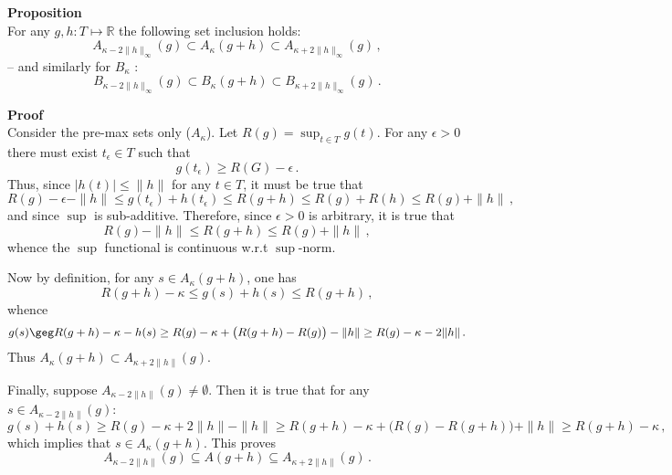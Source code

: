 \documentclass[a4paper]{article}
\newcommand{\Real}{\mathbb{R}}
\begin{document}
\noindent\textbf{Proposition}\hfill\\
For any $g, h:T\mapsto \Real$ the following set inclusion holds:
\[ A_{\kappa - 2\|h\|_\infty}(g) \subset A_\kappa(g+h)
                                 \subset A_{\kappa + 2\|h\|_\infty}(g)\,, \]
-- and similarly for $B_\kappa$ :
\[ B_{\kappa - 2\|h\|_\infty}(g) \subset B_\kappa(g+h)
                                 \subset B_{\kappa + 2\|h\|_\infty}(g)\,. \]

\noindent \textbf{Proof}\hfill\\
Consider the pre-max sets only ($A_\kappa$). Let $R(g) = \sup_{t\in T} g(t)$.
For any $\epsilon>0$ there must exist $t_\epsilon\in T$ such that
\[ g(t_\epsilon) \geq R(G) - \epsilon \,. \]
Thus, since $|h(t)| \leq \|h\|$ for any $t\in T$, it must be true that
\[ R(g) - \epsilon - \|h\| \leq g(t_\epsilon) + h(t_\epsilon)
                           \leq R(g + h)
                           \leq R(g) + R(h)
                           \leq R(g) + \|h\|\,,
\]
and since $\sup$ is sub-additive. Therefore, since $\epsilon>0$ is arbitrary,
it is true that
\[ R(g) - \|h\| \leq R(g + h) \leq R(g) + \|h\|\,, \]
whence the $\sup$ functional is continuous w.r.t $\sup$-norm.

Now by definition, for any $s\in A_\kappa(g+h)$, one has
\[ R(g+h) - \kappa \leq g(s)+h(s) \leq R(g+h)\,, \]
whence
\[ g(s) \geg R(g+h) - \kappa - h(s)
        \geq R(g) - \kappa + \bigl(R(g+h) - R(g)\bigr) - \|h\|
        \geq R(g) - \kappa - 2\|h\|\,. \]
Thus $A_\kappa(g+h) \subset A_{\kappa + 2\|h\|}(g)$.

Finally, suppose $A_{\kappa-2\|h\|}(g) \neq \emptyset$. Then it is true that
for any $s\in A_{\kappa-2\|h\|}(g)$:
\[ g(s) + h(s) \geq R(g) - \kappa + 2\|h\| - \|h\|
               \geq R(g+h) - \kappa + \bigl( R(g) - R(g+h) \bigr) + \|h\|
               \geq R(g+h) - \kappa \,,\]
which implies that $s\in A_\kappa(g+h)$. This proves
\[ A_{\kappa-2\|h\|}(g)\subseteq A(g+h) \subseteq A_{\kappa+2\|h\|}(g) \,.\]


\end{document}
